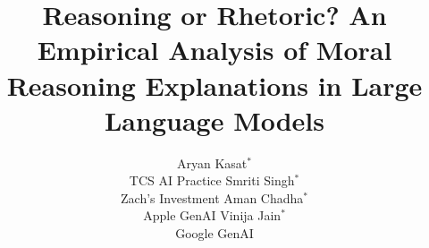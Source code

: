 \documentclass{article}
\begin{document}
\title{Reasoning or Rhetoric? An Empirical Analysis of Moral Reasoning Explanations in Large Language Models}

\author{%
  Aryan Kasat$^{*}$ \\
  TCS AI Practice
  \And
  Smriti Singh$^{*}$ \\
  Zach's Investment
  \And
  Aman Chadha$^{*}$ \\
  Apple GenAI
  \And
  Vinija Jain$^{*}$ \\
  Google GenAI
}

\maketitle

\fancyhead{}

\renewcommand{\thefootnote}{\fnsymbol{footnote}}
\renewcommand{\thefootnote}{\arabic{footnote}}
\end{document}
